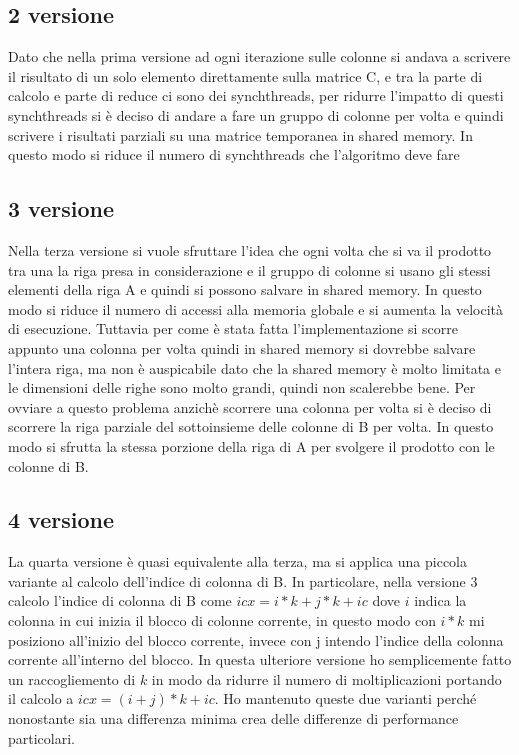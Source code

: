 \documentclass[conference]{IEEEtran}
\begin{document}
\subsection{2 versione}
Dato che nella prima versione ad ogni iterazione sulle colonne si andava a scrivere il risultato di un solo elemento direttamente sulla matrice C, e tra la parte di calcolo e parte di reduce ci sono dei synchthreads, per ridurre l'impatto di questi synchthreads si è deciso di andare a fare un gruppo di colonne per volta e quindi scrivere i risultati parziali su una matrice temporanea in shared memory. In questo modo si riduce il numero di synchthreads che l'algoritmo deve fare 

\subsection{3 versione}
Nella terza versione si vuole sfruttare l'idea che ogni volta che si va il prodotto tra una la riga presa in considerazione e il gruppo di colonne si usano gli stessi elementi della riga A e quindi si possono salvare in shared memory. In questo modo si riduce il numero di accessi alla memoria globale e si aumenta la velocità di esecuzione. Tuttavia per come è stata fatta l'implementazione si scorre appunto una colonna per volta quindi in shared memory si dovrebbe salvare l'intera riga, ma non è auspicabile dato che la shared memory è molto limitata e le dimensioni delle righe sono molto grandi, quindi non scalerebbe bene.
Per ovviare a questo problema anzichè scorrere una colonna per volta si è deciso di scorrere la riga parziale del sottoinsieme delle colonne di B per volta. In questo modo si sfrutta la stessa porzione della riga di A per svolgere il prodotto con le colonne di B.

\subsection{4 versione}
La quarta versione è quasi equivalente alla terza, ma si applica una piccola variante al calcolo dell'indice di colonna di B. In particolare, nella versione 3
calcolo l'indice di colonna di B come $icx = i * k + j * k + ic$ dove $i$ indica la colonna in cui inizia il blocco di colonne corrente, in questo modo con $i*k$ mi posiziono all'inizio del blocco corrente, invece con j intendo l'indice della colonna corrente all'interno del blocco. In questa ulteriore versione ho semplicemente fatto un raccogliemento di $k$ in modo da ridurre il numero di moltiplicazioni portando il calcolo a $icx = (i + j) * k +ic$. Ho mantenuto queste due varianti perché nonostante sia una differenza minima crea delle differenze di performance particolari. 
\end{document}
